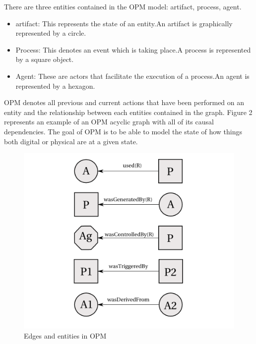  There are three entities contained in the OPM model: artifact, process, agent. 

\begin{itemize}
\item
artifact: This represents the state of an entity.An artifact is graphically represented by a circle.

\item
Process: This denotes an event which is taking place.A process is represented by a square object.

\item 
Agent: These are actors that facilitate the execution of a process.An agent is represented by a hexagon.
\end{itemize}

OPM denotes all previous and current actions that have been performed on an entity and  the relationship between each entities contained in the graph. Figure 2 represents an example of an OPM acyclic graph with all of its causal dependencies. The goal of OPM is to be able to model the state of how things both digital or physical are at a given state.   

\begin{figure}
\begin{center}

\includegraphics{opm_convention.PNG}
\end{center}
\caption{Edges and entities in OPM}
\label{autom}
\end{figure}

